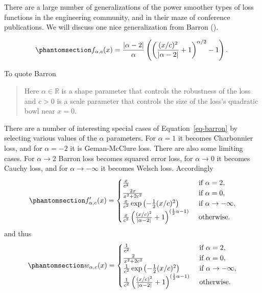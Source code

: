 \documentclass[
  12pt,
  letterpaper,
  DIV=11,
  numbers=noendperiod]{scrartcl}
\newcommand{\sectionbreak}{\pagebreak}
\theoremstyle{plain}
\theoremstyle{plain}
\theoremstyle{plain}
\theoremstyle{definition}
\theoremstyle{remark}
\begin{document}
There are a large number of generalizations of the power smoother types
of loss functions in the engineering community, and in their maze of
conference publications. We will discuss one nice generalization from
Barron ().

\begin{equation}\phantomsection\label{eq-barron}{
f_{\alpha,c}(x)=\frac{|\alpha-2|}{\alpha}\left(\left(\frac{(x/c)^2}{|\alpha-2|}+1\right)^{\alpha/2}-1\right).\
}\end{equation}

To quote Barron

\begin{quote}
Here \(\alpha\in\mathbb{R}\) is a shape parameter that controls the
robustness of the loss and \(c>0\) is a scale parameter that controls
the size of the loss's quadratic bowl near \(x=0\).
\end{quote}

There are a number of interesting special cases of
Equation~\ref{eq-barron} by selecting various values of the \(\alpha\)
parameters. For \(\alpha=1\) it becomes Charbonnier loss, and for
\(\alpha=-2\) it is Geman-McClure loss. There are also some limiting
cases. For \(\alpha\rightarrow 2\) Barron loss becomes squared error
loss, for \(\alpha\rightarrow 0\) it becomes Cauchy loss, and for
\(\alpha\rightarrow-\infty\) it becomes Welsch loss. Accordingly
\begin{equation}\phantomsection\label{eq-barroni}{
f'_{\alpha,c}(x)=\begin{cases}
\frac{x}{c^2}&\text{ if }\alpha=2,\\
\frac{2x}{x^2+2c^2}&\text{ if }\alpha=0,\\
\frac{x}{c^2}\exp\left(-\frac12(x/c)^2\right)&\text{ if }\alpha\rightarrow-\infty,\\
\frac{x}{c^2}\left(\frac{(x/c)^2}{|\alpha-2|}+1\right)^{(\frac12\alpha-1)}&\text{ otherwise}.
\end{cases}
}\end{equation} and thus
\begin{equation}\phantomsection\label{eq-barronw}{
w_{\alpha,c}(x)=\begin{cases}
\frac{1}{c^2}&\text{ if }\alpha=2,\\
\frac{2}{x^2+2c^2}&\text{ if }\alpha=0,\\
\frac{1}{c^2}\exp\left(-\frac12(x/c)^2\right)&\text{ if }\alpha\rightarrow-\infty,\\
\frac{1}{c^2}\left(\frac{(x/c)^2}{|\alpha-2|}+1\right)^{(\frac12\alpha-1)}&\text{ otherwise}.
\end{cases}
}\end{equation} \sectionbreak
\end{document}
